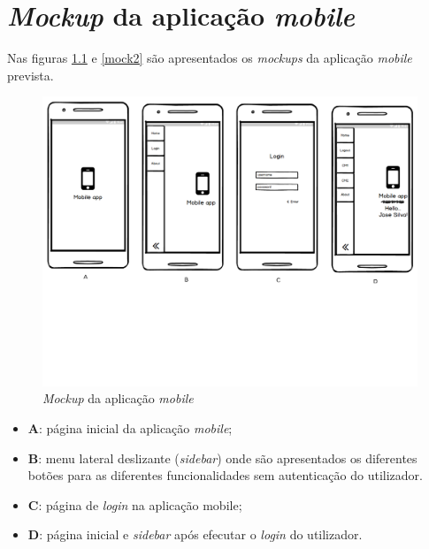 \chapter{\textit{Mockup} da aplicação \textit{mobile}}
\label{Mockup}

Nas figuras \ref{mock1} e \ref{mock2} são apresentados os \textit{mockups} da aplicação \textit{mobile} prevista. 


\begin{figure}[h]
	\centering
	\includegraphics[width=\linewidth]{esquemas/mockup/1.pdf}
	\caption{\textit{Mockup} da aplicação \textit{mobile}}
	\label{mock1}
\end{figure}

\begin{itemize}
	\item \textbf{A}: página inicial da aplicação \textit{mobile}; 
	\item \textbf{B}: menu lateral deslizante (\textit{sidebar}) onde são apresentados os diferentes botões para as diferentes funcionalidades sem autenticação do utilizador.  
	\item \textbf{C}: página de \textit{login} na aplicação mobile; 
	\item \textbf{D}: página inicial e \textit{sidebar} após efecutar o \textit{login} do utilizador. 
\end{itemize}


\newpage


